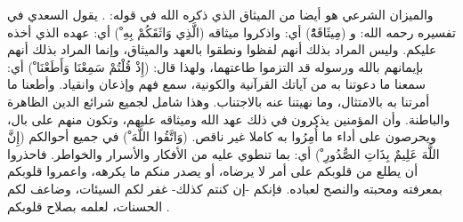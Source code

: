 والميزان الشرعي هو أيضا من الميثاق الذي ذكره الله في قوله:
\quranayah*[5][7]{\footnotesize \surahname*[5]}. يقول السعدي في تفسيره رحمه الله:
و (مِيثَاقَهُْ) أي: واذكروا ميثاقه (الَّذِي وَاثَقَكُمْ بِهِ ْ) أي: عهده الذي أخذه عليكم. وليس المراد بذلك أنهم لفظوا ونطقوا بالعهد والميثاق، وإنما المراد بذلك أنهم بإيمانهم بالله ورسوله قد التزموا طاعتهما، ولهذا قال: (إِذْ قُلْتُمْ سَمِعْنَا وَأَطَعْنَا ْ) أي: سمعنا ما دعوتنا به من آياتك القرآنية والكونية، سمع فهم وإذعان وانقياد. وأطعنا ما أمرتنا به بالامتثال، وما نهيتنا عنه بالاجتناب. وهذا شامل لجميع شرائع الدين الظاهرة والباطنة. وأن المؤمنين يذكرون في ذلك عهد الله وميثاقه عليهم، وتكون منهم على بال، ويحرصون على أداء ما أُمِرُوا به كاملا غير ناقص. (وَاتَّقُوا اللَّهَ ْ) في جميع أحوالكم (إِنَّ اللَّهَ عَلِيمٌ بِذَاتِ الصُّدُورِ ْ) أي: بما تنطوي عليه من الأفكار والأسرار والخواطر. فاحذروا أن يطلع من قلوبكم على أمر لا يرضاه، أو يصدر منكم ما يكرهه، واعمروا قلوبكم بمعرفته ومحبته والنصح لعباده. فإنكم -إن كنتم كذلك- غفر لكم السيئات، وضاعف لكم الحسنات، لعلمه بصلاح قلوبكم \cite{tafsir_Saadi}.

